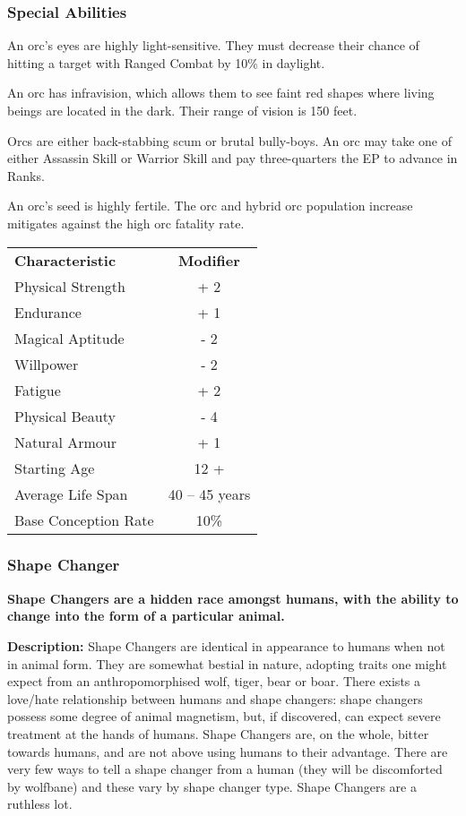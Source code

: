 \begin{multicols*}{3}
\subsubsection{Special Abilities}

\begin{Enumerate}
\item
An orc's eyes are highly light-sensitive. They must decrease their
chance of hitting a target with Ranged Combat by 10\% in daylight.

\item
An orc has infravision, which allows them to see faint red shapes
where living beings are located in the dark. Their range of vision is
150 feet.

\item
Orcs are either back-stabbing scum or brutal bully-boys. An orc may
take one of either Assassin Skill or Warrior Skill and pay
three-quarters the EP to advance in Ranks.

\item
An orc's seed is highly fertile. The orc and hybrid orc population
increase mitigates against the high orc fatality rate.
\end{Enumerate}

\begin{tabularx}{\linewidth}{Xc}
\textbf{Characteristic} & \textbf{Modifier} \\
Physical Strength	& + 2 \\
Endurance		& + 1 \\
Magical Aptitude	& - 2 \\
Willpower		& - 2 \\
Fatigue			& + 2 \\
Physical Beauty		& - 4 \\
Natural Armour		& + 1 \\
Starting Age		& 12 + \\
Average Life Span	& 40 -- 45 years \\
Base Conception Rate	& 10\% \\
\end{tabularx}

\subsubsection{Shape Changer}

\textbf{Shape Changers are a hidden race amongst humans, with the
ability to change into the form of a particular animal.}

\textbf{Description:} Shape Changers are identical in appearance to
humans when not in animal form. They are somewhat bestial in nature,
adopting traits one might expect from an anthropomorphised wolf,
tiger, bear or boar. There exists a love/hate relationship between
humans and shape changers: shape changers possess some degree of
animal magnetism, but, if discovered, can expect severe treatment at
the hands of humans. Shape Changers are, on the whole, bitter towards
humans, and are not above using humans to their advantage. There are
very few ways to tell a shape changer from a human (\eg they will be
discomforted by wolfbane) and these vary by shape changer type. Shape
Changers are a ruthless lot.


\end{multicols*}
